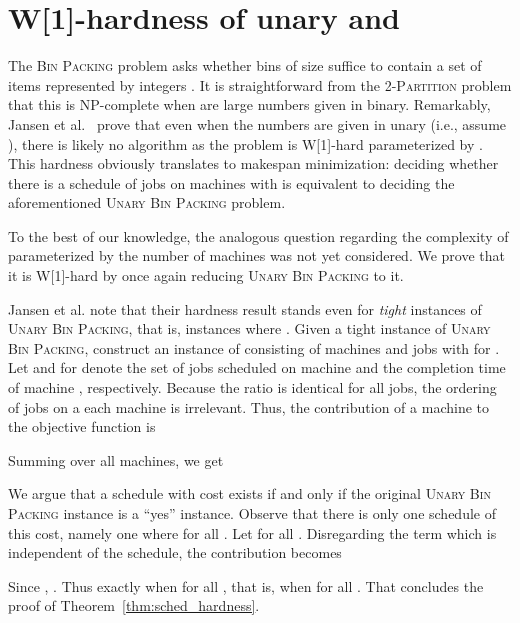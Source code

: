 \documentclass{llncs}
\newcommand{\NP}{{\sf NP}\xspace}
\newcommand{\W}[1]{{\sf W}[#1]\xspace}
\begin{document}
\section{\W{1}-hardness of unary  and }
\label{sec:hardness}

The \textsc{Bin Packing} problem asks whether  bins of size  suffice to contain a set of  items represented by integers .
It is straightforward from the \textsc{2-Partition} problem that this is \NP-complete when  are large numbers given in binary.
Remarkably, Jansen et al.~\cite{JansenKMS:13} prove that even when the numbers are given in unary (i.e., assume ), there is likely no  algorithm as the problem is \W{1}-hard parameterized by . This hardness obviously translates to makespan minimization: deciding whether there is a schedule of jobs  on  machines with  is equivalent to deciding the aforementioned \textsc{Unary Bin Packing} problem.

To the best of our knowledge, the analogous question regarding the complexity of  parameterized by the number of machines  was not yet considered. We prove that it is \W{1}-hard by once again reducing \textsc{Unary Bin Packing} to it.

Jansen et al. note that their hardness result stands even for \textit{tight} instances of \textsc{Unary Bin Packing}, that is, instances where .
Given a tight instance of \textsc{Unary Bin Packing}, construct an instance of  consisting of  machines and  jobs with  for . Let  and  for  denote the set of jobs scheduled on machine  and the completion time of machine , respectively. Because the ratio  is identical for all jobs, the ordering of jobs on a each machine is irrelevant. Thus, the contribution of a machine  to the objective function is



Summing over all machines, we get



We argue that a schedule with cost  exists if and only if the original \textsc{Unary Bin Packing} instance is a ``yes'' instance. Observe that there is only one schedule of this cost, namely one where  for all . Let  for all . Disregarding the term  which is independent of the schedule, the contribution becomes



Since ,  . Thus  exactly when  for all , that is, when  for all . That concludes the proof of Theorem~\ref{thm:sched_hardness}.
\end{document}
